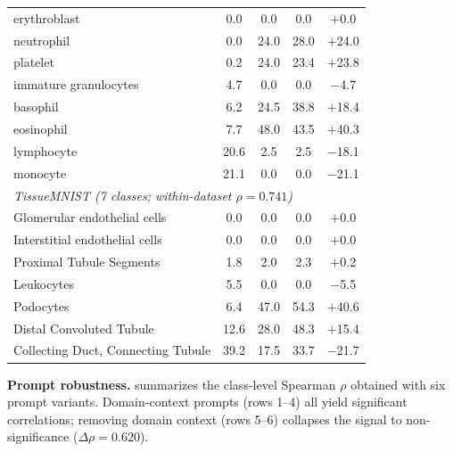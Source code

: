 \documentclass[11pt,a4paper]{article}
\begin{document}
\begin{table}[t]
\begin{tabular}{lcccc}
erythroblast & 0.0 & 0.0 & 0.0 & $+$0.0 \\
neutrophil & 0.0 & 24.0 & 28.0 & $+$24.0 \\
platelet & 0.2 & 24.0 & 23.4 & $+$23.8 \\
immature granulocytes & 4.7 & 0.0 & 0.0 & $-$4.7 \\
basophil & 6.2 & 24.5 & 38.8 & $+$18.4 \\
eosinophil & 7.7 & 48.0 & 43.5 & $+$40.3 \\
lymphocyte & 20.6 & 2.5 & 2.5 & $-$18.1 \\
monocyte & 21.1 & 0.0 & 0.0 & $-$21.1 \\
\midrule
\multicolumn{5}{l}{\textit{TissueMNIST (7 classes; within-dataset $\rho=0.741$)}} \\
Glomerular endothelial cells & 0.0 & 0.0 & 0.0 & $+$0.0 \\
Interstitial endothelial cells & 0.0 & 0.0 & 0.0 & $+$0.0 \\
Proximal Tubule Segments & 1.8 & 2.0 & 2.3 & $+$0.2 \\
Leukocytes & 5.5 & 0.0 & 0.0 & $-$5.5 \\
Podocytes & 6.4 & 47.0 & 54.3 & $+$40.6 \\
Distal Convoluted Tubule & 12.6 & 28.0 & 48.3 & $+$15.4 \\
Collecting Duct, Connecting Tubule & 39.2 & 17.5 & 33.7 & $-$21.7 \\
\bottomrule
\end{tabular}
\end{table}

\textbf{Prompt robustness.}  summarizes the class-level Spearman $\rho$ obtained with six prompt variants. Domain-context prompts (rows 1--4) all yield significant correlations; removing domain context (rows 5--6) collapses the signal to non-significance ($\Delta\rho=0.620$).
\end{document}
